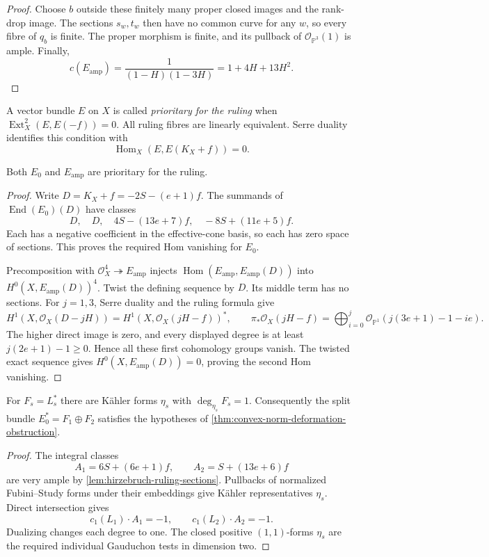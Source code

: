 \begin{proof}
Choose $b$ outside these finitely many proper closed images and the rank-drop image. The sections $s_w,t_w$ then have no common curve for any $w$, so every fibre of $q_b$ is finite. The proper morphism is finite, and its pullback of $\mathcal O_{\mathbb P^3}(1)$ is ample. Finally,
\[
 c(E_{\mathrm{amp}})=\frac1{(1-H)(1-3H)}=1+4H+13H^2.
\]
\end{proof}

A vector bundle $E$ on $X$ is called \emph{prioritary for the ruling} when $\operatorname{Ext}^2_X(E,E(-f))=0$. All ruling fibres are linearly equivalent. Serre duality identifies this condition with
\[
 \operatorname{Hom}_X(E,E(K_X+f))=0.
\]

\begin{lemma}\label{lem:hirzebruch-prioritary-comparison}
Both $E_0$ and $E_{\mathrm{amp}}$ are prioritary for the ruling.
\end{lemma}
\begin{proof}
Write $D=K_X+f=-2S-(e+1)f$. The summands of $\operatorname{End}(E_0)(D)$ have classes
\[
 D,\quad D,\quad 4S-(13e+7)f,\quad -8S+(11e+5)f.
\]
Each has a negative coefficient in the effective-cone basis, so each has zero space of sections. This proves the required Hom vanishing for $E_0$.

Precomposition with $\mathcal O_X^4\twoheadrightarrow E_{\mathrm{amp}}$ injects $\operatorname{Hom}(E_{\mathrm{amp}},E_{\mathrm{amp}}(D))$ into $H^0(X,E_{\mathrm{amp}}(D))^4$. Twist the defining sequence by $D$. Its middle term has no sections. For $j=1,3$, Serre duality and the ruling formula give
\[
 H^1(X,\mathcal O_X(D-jH))
 =H^1(X,\mathcal O_X(jH-f))^*,
 \qquad
 \pi_*\mathcal O_X(jH-f)
 =\bigoplus_{i=0}^j\mathcal O_{\mathbb P^1}(j(3e+1)-1-ie).
\]
The higher direct image is zero, and every displayed degree is at least $j(2e+1)-1\geq0$. Hence all these first cohomology groups vanish. The twisted exact sequence gives $H^0(X,E_{\mathrm{amp}}(D))=0$, proving the second Hom vanishing.
\end{proof}

\begin{proposition}\label{prop:hirzebruch-positive-dual-tests}
For $F_s=L_s^*$ there are K\"ahler forms $\eta_s$ with $\deg_{\eta_s}F_s=1$. Consequently the split bundle $E_0^*=F_1\oplus F_2$ satisfies the hypotheses of \cref{thm:convex-norm-deformation-obstruction}.
\end{proposition}
\begin{proof}
The integral classes
\[
 A_1=6S+(6e+1)f,\qquad A_2=S+(13e+6)f
\]
are very ample by \cref{lem:hirzebruch-ruling-sections}. Pullbacks of normalized Fubini--Study forms under their embeddings give K\"ahler representatives $\eta_s$. Direct intersection gives
\[
 c_1(L_1)\cdot A_1=-1,\qquad
 c_1(L_2)\cdot A_2=-1.
\]
Dualizing changes each degree to one. The closed positive $(1,1)$-forms $\eta_s$ are the required individual Gauduchon tests in dimension two.
\end{proof}
